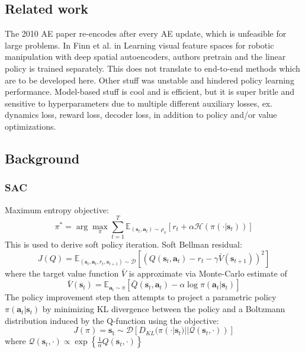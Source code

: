 \documentclass{article}
\newcommand{\argmax}{\arg\!\max}
\begin{document}
\subsection{Related work}
The 2010 AE paper re-encodes after every AE update, which is unfeasible for large problems.
In Finn et al. in Learning visual feature spaces for robotic manipulation with deep spatial autoencoders,
authors pretrain and the linear policy is trained separately. This does not translate to end-to-end methods
which are to be developed here.
Other stuff was unstable and hindered policy learning performance.
Model-based stuff is cool and is efficient, but it is super britle and sensitive to hyperparameters
due to multiple different auxiliary losses, ex. dynamics loss, reward loss, decoder loss,
in addition to policy and/or value optimizations.

\subsection{Background}
\subsubsection{SAC}
Maximum entropy objective:
\begin{equation}
\pi^{ * } = \argmax_{\pi} \sum_{t=1}^{T} \mathbb{E}_{ (\bm{s}_{t}, \bm{a}_{t} ) \sim \rho_{ \pi } }
\left[ r_{ t } + \alpha \mathcal{H} (\pi (\cdot|\bm{s}_{t})) \right] 
\end{equation}
This is used to derive soft policy iteration.
Soft Bellman residual:
\begin{equation}
		J (Q) = \mathbb{E}_{ (\bm{s}_{t}, \bm{a}_{t}, r_{ t }, \bm{s}_{t+1} ) \sim \mathcal{D} }
		\left[ 
\left( Q (\bm{s}_{t}, \bm{a}_{t} ) - r_{ t } - \gamma \bar{V} (\bm{s}_{t+1}) \right)^{ 2 } 
		\right] 
\end{equation}
where the target value function $ \bar{V}  $ is approximate via Monte-Carlo estimate
of
\begin{equation}
\bar{V} (\bm{s}_{t}) = \mathbb{E}_{ \bm{a}_{t} \sim \pi }
\left[ 
\bar{Q} (\bm{s}_{t}, \bm{a}_{t} ) - \alpha \log \pi (\bm{a}_{t}| \bm{s}_{t} )
\right] 
\end{equation}
The policy improvement step then attempts to project a parametric policy
$ \pi (\bm{a}_{t}| \bm{s}_{t} )  $ by minimizing KL divergence between the policy
and a Boltzmann distribution induced by the Q-function using
the objective:
\begin{equation}
J (\pi) = \mathbb{\bm{s}_{t} \sim \mathcal{D}} \left[ 
D_{ KL } (\pi (\cdot| \bm{s}_{t})|| \mathcal{Q} (\bm{s}_{t}, \cdot))
\right] 
\end{equation}
where $ \mathcal{Q} (\bm{s}_{t}, \cdot) \propto \exp \left\{ 
\frac{1}{\alpha}  Q (\bm{s}_{t}, \cdot)
\right\}   $
\end{document}
